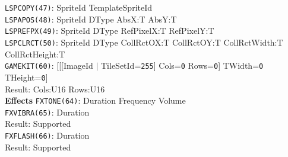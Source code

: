 \documentclass[a4paper,twocolumn,11pt]{article}
\begin{document}
\begin{flushleft}
\vskip 4pt
{\tt LSPCOPY(47)}: SpriteId TemplateSpriteId \\
\vskip 4pt
{\tt LSPAPOS(48)}: SpriteId DType AbsX:T AbsY:T \\
\vskip 4pt
{\tt LSPREFPX(49)}: SpriteId DType RefPixelX:T RefPixelY:T \\
\vskip 4pt
{\tt LSPCLRCT(50)}: SpriteId DType CollRctOX:T CollRctOY:T CollRctWidth:T CollRctHeight:T \\
\vskip 4pt
{\tt GAMEKIT(60)}: [[[ImageId $|$ TileSetId={\tt 255}] Cols={\tt 0} Rows={\tt 0}] TWidth={\tt 0} THeight={\tt 0}] \\
Result: Cols:U16 Rows:U16 \\
\vskip 6pt
{\bf Effects}
\vskip 2pt
{\tt FXTONE(64)}: Duration Frequency Volume \\
\vskip 4pt
{\tt FXVIBRA(65)}: Duration \\
Result: Supported \\
\vskip 4pt
{\tt FXFLASH(66)}: Duration \\
Result: Supported \\
\vskip 4pt
\end{flushleft}
\end{document}
